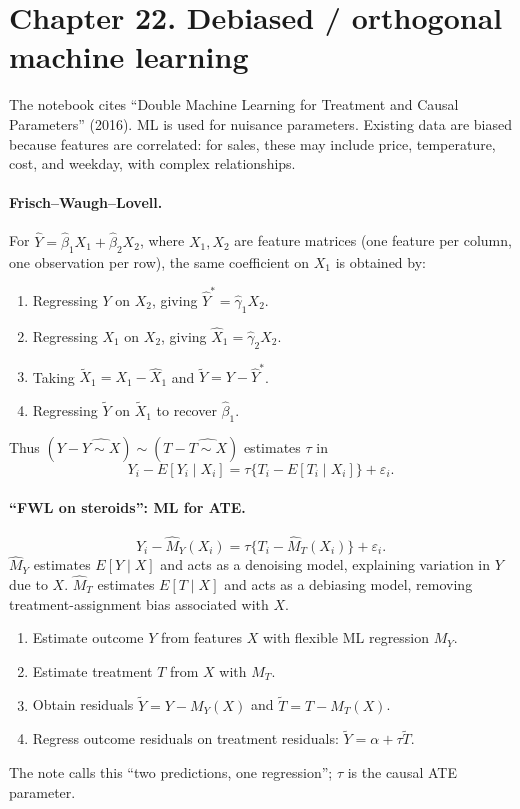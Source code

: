 \section{Chapter 22. Debiased / orthogonal machine learning}
The notebook cites ``Double Machine Learning for Treatment and Causal Parameters'' (2016). ML is used for nuisance parameters. Existing data are biased because features are correlated: for sales, these may include price, temperature, cost, and weekday, with complex relationships.

\paragraph{Frisch--Waugh--Lovell.}
For $\hat Y=\hat\beta_1X_1+\hat\beta_2X_2$, where $X_1,X_2$ are feature matrices (one feature per column, one observation per row), the same coefficient on $X_1$ is obtained by:
\begin{enumerate}
\item Regressing $Y$ on $X_2$, giving $\hat Y^*=\hat\gamma_1X_2$.
\item Regressing $X_1$ on $X_2$, giving $\hat X_1=\hat\gamma_2X_2$.
\item Taking $\widetilde X_1=X_1-\hat X_1$ and $\widetilde Y=Y-\hat Y^*$.
\item Regressing $\widetilde Y$ on $\widetilde X_1$ to recover $\hat\beta_1$.
\end{enumerate}
Thus $(Y-\widehat{Y\sim X})\sim(T-\widehat{T\sim X})$ estimates $\tau$ in
\[Y_i-E[Y_i\mid X_i]=\tau\{T_i-E[T_i\mid X_i]\}+\varepsilon_i.\]

\paragraph{``FWL on steroids'': ML for ATE.}
\[Y_i-\hat M_Y(X_i)=\tau\{T_i-\hat M_T(X_i)\}+\varepsilon_i.\]
$\hat M_Y$ estimates $E[Y\mid X]$ and acts as a denoising model, explaining variation in $Y$ due to $X$. $\hat M_T$ estimates $E[T\mid X]$ and acts as a debiasing model, removing treatment-assignment bias associated with $X$.
\begin{enumerate}
\item Estimate outcome $Y$ from features $X$ with flexible ML regression $M_Y$.
\item Estimate treatment $T$ from $X$ with $M_T$.
\item Obtain residuals $\widetilde Y=Y-M_Y(X)$ and $\widetilde T=T-M_T(X)$.
\item Regress outcome residuals on treatment residuals: $\widetilde Y=\alpha+\tau\widetilde T$.
\end{enumerate}
The note calls this ``two predictions, one regression''; $\tau$ is the causal ATE parameter.

